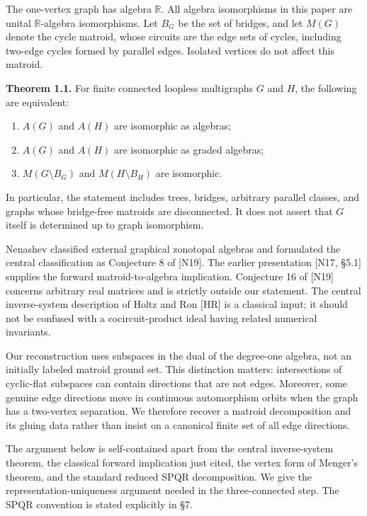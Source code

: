 \documentclass[11pt]{article}
\begin{document}
The one-vertex graph has algebra $\mathbb R$. All algebra isomorphisms in this paper are unital $\mathbb R$-algebra isomorphisms. Let $B_G$ be the set of bridges, and let $M(G)$ denote the cycle matroid, whose circuits are the edge sets of cycles, including two-edge cycles formed by parallel edges. Isolated vertices do not affect this matroid.

\textbf{Theorem 1.1.} For finite connected loopless multigraphs $G$ and $H$, the following are equivalent:

\begin{enumerate}
\item[1.] $A(G)$ and $A(H)$ are isomorphic as algebras;
\item[2.] $A(G)$ and $A(H)$ are isomorphic as graded algebras;
\item[3.] $M(G\setminus B_G)$ and $M(H\setminus B_H)$ are isomorphic.
\end{enumerate}

In particular, the statement includes trees, bridges, arbitrary parallel classes, and graphs whose bridge-free matroids are disconnected. It does not assert that $G$ itself is determined up to graph isomorphism.

Nenashev classified external graphical zonotopal algebras and formulated the central classification as Conjecture 8 of [N19]. The earlier presentation [N17, \S{}5.1] supplies the forward matroid-to-algebra implication. Conjecture 16 of [N19] concerns arbitrary real matrices and is strictly outside our statement. The central inverse-system description of Holtz and Ron [HR] is a classical input; it should not be confused with a cocircuit-product ideal having related numerical invariants.

Our reconstruction uses subspaces in the dual of the degree-one algebra, not an initially labeled matroid ground set. This distinction matters: intersections of cyclic-flat subspaces can contain directions that are not edges. Moreover, some genuine edge directions move in continuous automorphism orbits when the graph has a two-vertex separation. We therefore recover a matroid decomposition and its gluing data rather than insist on a canonical finite set of all edge directions.

The argument below is self-contained apart from the central inverse-system theorem, the classical forward implication just cited, the vertex form of Menger's theorem, and the standard reduced SPQR decomposition. We give the representation-uniqueness argument needed in the three-connected step. The SPQR convention is stated explicitly in \S{}7.
\end{document}
